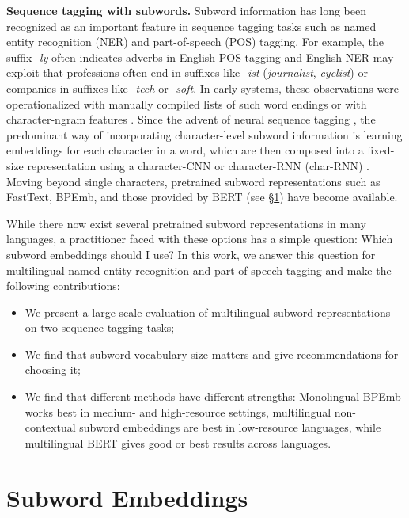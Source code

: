 \documentclass[11pt,a4paper]{article}
\begin{document}
\noindent\textbf{Sequence tagging with subwords.} Subword information has long been recognized as an important feature in sequence tagging tasks such as named entity recognition (NER) and part-of-speech (POS) tagging.
For example, the suffix \emph{-ly} often indicates adverbs in English POS tagging and English NER may exploit that professions often end in suffixes like \emph{-ist} (\emph{journalist}, \emph{cyclist}) or companies in suffixes like \emph{-tech} or \emph{-soft}.
In early systems, these observations were operationalized with manually compiled lists of such word endings or with character-ngram features \citep{nadeau2007survey}.
Since the advent of neural sequence tagging \citep{graves2012supervised,huang2015bidirectional}, the predominant way of incorporating character-level subword information is learning embeddings for each character in a word, which are then composed into a fixed-size representation using a character-CNN \citep{chiu2016named} or character-RNN (char-RNN) \citep{lample2016neural}.
Moving beyond single characters, pretrained subword representations such as FastText, BPEmb, and those provided by BERT (see §\ref{sec:subword-embeddings}) have become available.

While there now exist several pretrained subword representations in many languages, a practitioner faced with these options has a simple question: Which subword embeddings should I use?
In this work, we answer this question for multilingual named entity recognition and part-of-speech tagging and make the following contributions:\begin{itemize}
	\setlength{\itemsep}{-3pt}
	\setlength{\parsep}{1pt}
	\item We present a large-scale evaluation of multilingual subword representations on two sequence tagging tasks;
	\item We find that subword vocabulary size matters and give recommendations for choosing it;
	\item We find that different methods have different strengths: Monolingual BPEmb works best in medium- and high-resource settings, multilingual non-contextual subword embeddings are best in low-resource languages, while multilingual BERT gives good or best results across languages.
\end{itemize}

\section{Subword Embeddings}
\label{sec:subword-embeddings}
\end{document}
